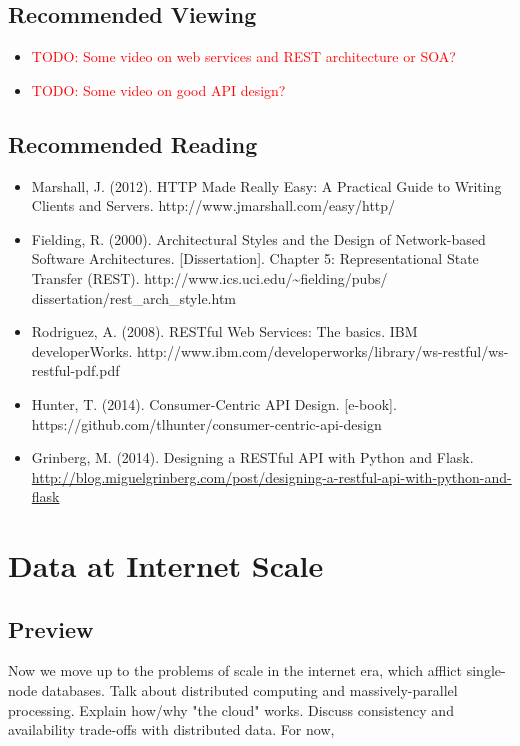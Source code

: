 \documentclass[11pt]{book}
\newcommand{\todo}[1]{\textcolor{red}{TODO: #1}} %
\begin{document}
\section*{Recommended Viewing}
\begin{itemize}
    \item \todo{Some video on web services and REST architecture or SOA?}
    \item \todo{Some video on good API design?}
\end{itemize}

\section*{Recommended Reading}
\begin{itemize}
    \item Marshall, J. (2012).  HTTP Made Really Easy: A Practical Guide to Writing Clients and Servers.  http://www.jmarshall.com/easy/http/
    \item Fielding, R. (2000). Architectural Styles and the Design of Network-based Software Architectures. [Dissertation]. Chapter 5: Representational State Transfer (REST). http://www.ics.uci.edu/\~{}fielding/pubs/ dissertation/rest\_arch\_style.htm
    \item Rodriguez, A. (2008). RESTful Web Services: The basics.  IBM developerWorks. http://www.ibm.com/developerworks/library/ws-restful/ws-restful-pdf.pdf
    \item Hunter, T. (2014). Consumer-Centric API Design. [e-book]. \\https://github.com/tlhunter/consumer-centric-api-design
    \item Grinberg, M. (2014). Designing a RESTful API with Python and Flask. \url{http://blog.miguelgrinberg.com/post/designing-a-restful-api-with-python-and-flask}
\end{itemize}









\chapter{Data at Internet Scale}

\section*{Preview}

Now we move up to the problems of scale in the internet era, which afflict single-node databases.  Talk about distributed computing and massively-parallel processing.  Explain how/why "the cloud" works.  Discuss consistency and availability trade-offs with distributed data.  For now, 
\end{document}
